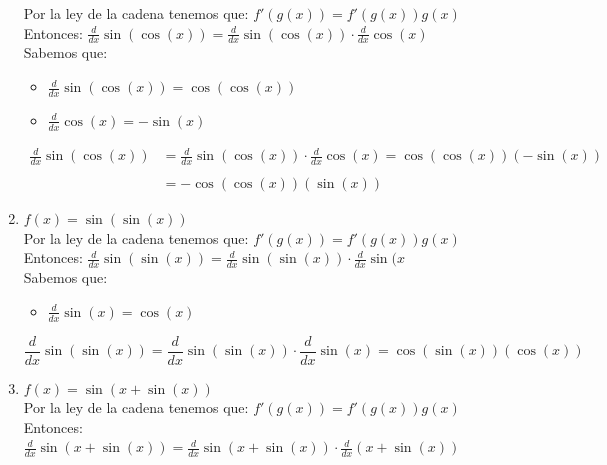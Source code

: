 \documentclass[12pt]{article}
\begin{document}
\begin{enumerate}[\hspace{9px} a)]
        Por la ley de la cadena tenemos que: \(f'(g(x))=f'(g(x))g(x)\)\\

        Entonces: \quad \(\displaystyle\frac{d}{dx}\sin(\cos(x))=\displaystyle\frac{d}{dx}\sin(\cos(x))\cdot\frac{d}{dx}\cos(x)\)\\

        Sabemos que:
        \begin{itemize}
            \item \(\displaystyle\frac{d}{dx}\sin(\cos(x))=\cos(\cos(x))\)
            \item \(\displaystyle\frac{d}{dx}\cos(x)=-\sin(x)\)
        \end{itemize}

        \begin{align*}
            \displaystyle\frac{d}{dx}\sin(\cos(x))&=\frac{d}{dx}\sin(\cos(x))\cdot\frac{d}{dx}\cos(x)=\cos(\cos(x))(-\sin(x))\\ \\
            &=-\cos(\cos(x))(\sin(x))
        \end{align*}
    \item \(f(x) = \sin(\sin(x))\)\\

        Por la ley de la cadena tenemos que: \(f'(g(x))=f'(g(x))g(x)\)\\

        Entonces: \quad \(\displaystyle\frac{d}{dx}\sin(\sin(x))=\displaystyle\frac{d}{dx}\sin(\sin(x))\cdot\displaystyle\frac{d}{dx}\sin(x\)\\

        Sabemos que:
        \begin{itemize}
            \item \(\displaystyle\frac{d}{dx}\sin(x)=\cos(x)\)
        \end{itemize}

        \[\displaystyle\frac{d}{dx}\sin(\sin(x))=\displaystyle\frac{d}{dx}\sin(\sin(x))\cdot\displaystyle\frac{d}{dx}\sin(x)=\cos(\sin(x))(\cos(x))\]
    \item \(f(x) = \sin(x+\sin(x))\)\\

        Por la ley de la cadena tenemos que: \(f'(g(x))=f'(g(x))g(x)\)\\

        Entonces: \quad \(\displaystyle\frac{d}{dx}\sin(x+\sin(x))=\frac{d}{dx}\sin(x+\sin(x))\cdot\frac{d}{dx}(x+\sin(x))\)\\


\end{enumerate}
\end{document}

